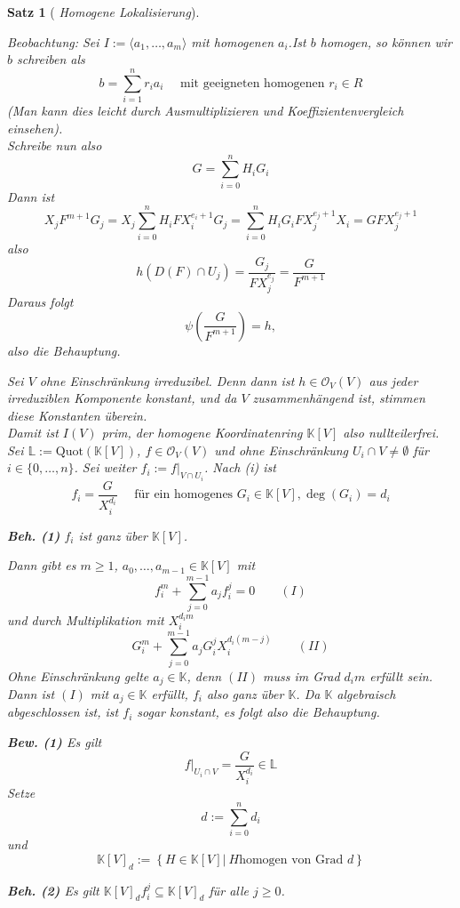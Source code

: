\documentclass[11pt]{book}
\newtheorem{theorem}{Satz}[section]
\theoremstyle{nonumberbreak}
\newenvironment{pr}[1][]{\ifthenelse{\equal{#1}{}}{\proof}{\proof[#1]}\rm}{\endproof}
\begin{document}
\begin{spacing}{1.3}
\begin{theorem}[ \rm \it Homogene Lokalisierung]
\begin{pr}
\begin{compactenum}
Beobachtung: Sei $I:= \langle a_1, \ldots, a_m \rangle$ mit homogenen $a_i$.Ist $b$ homogen, so können wir $b$ schreiben als
$$b = \sum_{i=1}^n r_i a_i \quad \textrm{ mit  geeigneten homogenen }r_i \in R$$
(Man kann dies leicht durch Ausmultiplizieren und Koeffizientenvergleich einsehen).\\
Schreibe nun also 
$$G= \sum_{i=0}^n H_i G_i$$
Dann ist
$$X_j F^{m+1} G_j = X_j \sum_{i=0}^n H_i F X_i^{e_i+1} G_j = \sum_{i=0}^n H_i G_i F X_j^{e_j+1} X_i = G F X_j^{e_j+1}$$
also
$$h(D(F) \cap U_j) = \frac{G_j}{F X_j^{e_j}} = \frac{G}{F^{m+1}}$$
Daraus folgt
$$\psi\left( \frac{G}{F^{m+1}}\right) = h,$$
also die Behauptung.

\item Sei $V$ ohne Einschränkung irreduzibel. Denn dann ist $h \in \mathcal{O}_V(V)$ aus jeder irreduziblen Komponente konstant, und da $V$ zusammenhängend ist, stimmen diese Konstanten überein.\\
Damit ist $I(V)$ prim, der homogene Koordinatenring $\mathbb{K}[V]$ also nullteilerfrei.\\
Sei $\mathbb{L}:= \textrm{Quot}(\mathbb{K}[V])$, $f \in \mathcal{O}_V(V)$ und ohne Einschränkung $U_i \cap V \neq \emptyset$ für $i \in \{0, \ldots, n \}$. Sei weiter $f_i := f \vert_{V \cap U_i }$.
Nach (i) ist
$$f_i = \frac{G}{X_i^{d_i}} \quad \textrm{ für ein homogenes } G_i \in \mathbb{K}[V], \deg(G_i)=d_i$$
\begin{compactenum}
\item[\textbf{Beh. (1)}] $f_i$ ist ganz über $\mathbb{K}[V]$.
\end{compactenum}
Dann gibt es $m \geqslant 1$, $a_0, \ldots, a_{m-1} \in \mathbb{K}[V]$ mit
$$f_i^m + \sum_{j=0}^{m-1} a_j f_i^j =0 \qquad (I)$$
und durch Multiplikation mit $X_i^{d_i m }$
$$G_i^m + \sum_{j=0}^{m-1} a_j G_i^j X_i^{d_i(m-j)} \qquad (II)$$
Ohne Einschränkung gelte $a_j \in \mathbb{K}$, denn $(II)$ muss im Grad $d_i m$ erfüllt sein.\\
Dann ist $(I)$ mit $a_j \in \mathbb{K}$ erfüllt, $f_i$ also ganz über $\mathbb{K}$. Da $\mathbb{K}$ algebraisch abgeschlossen ist, ist $f_i$ sogar konstant, es folgt also die Behauptung.
\begin{compactenum}
\item[\textbf{Bew. (1)}] Es gilt 
$$f \vert_{U_i \cap V} = \frac{G}{X_i^{d_i}} \in \mathbb{L}$$
Setze 
$$d:= \sum_{i=0}^n d_i$$
und 
$$\mathbb{K}[V]_d := \left\{H \in \mathbb{K}[V]  \vert \ H \textrm{homogen von Grad } d \right\}$$
\item[\textbf{Beh. (2)}] Es gilt $\mathbb{K}[V]_d f_i^j \subseteq \mathbb{K}[V]_d$ für alle $j \geqslant 0$.

\end{compactenum}
\end{compactenum}
\end{pr}
\end{theorem}
\end{spacing}
\end{document}
